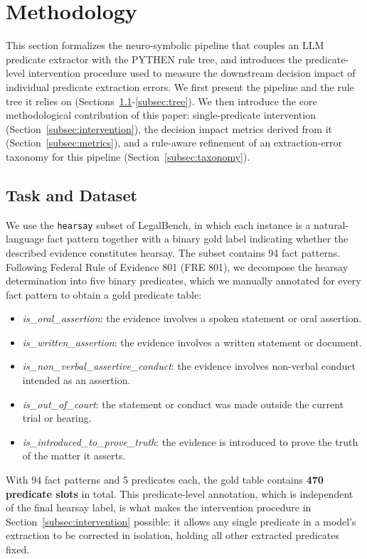 \section{Methodology}
\label{sec:method}

This section formalizes the neuro-symbolic pipeline that couples an LLM predicate extractor with the PYTHEN rule tree, and introduces the predicate-level intervention procedure used to measure the downstream decision impact of individual predicate extraction errors. We first present the pipeline and the rule tree it relies on (Sections~\ref{subsec:task}-\ref{subsec:tree}). We then introduce the core methodological contribution of this paper: single-predicate intervention (Section~\ref{subsec:intervention}), the decision impact metrics derived from it (Section~\ref{subsec:metrics}), and a rule-aware refinement of an extraction-error taxonomy for this pipeline (Section~\ref{subsec:taxonomy}).

\subsection{Task and Dataset}
\label{subsec:task}
We use the \texttt{hearsay} subset of LegalBench, in which each instance is a natural-language fact pattern together with a binary gold label indicating whether the described evidence constitutes hearsay. The subset contains 94 fact patterns. Following Federal Rule of Evidence 801 (FRE 801), we decompose the hearsay determination into five binary predicates, which we manually annotated for every fact pattern to obtain a gold predicate table:
\begin{itemize}
    \item \textit{is\_oral\_assertion}: the evidence involves a spoken statement or oral assertion.
    \item \textit{is\_written\_assertion}: the evidence involves a written statement or document.
    \item \textit{is\_non\_verbal\_assertive\_conduct}: the evidence involves non-verbal conduct intended as an assertion.
    \item \textit{is\_out\_of\_court}: the statement or conduct was made outside the current trial or hearing.
    \item \textit{is\_introduced\_to\_prove\_truth}: the evidence is introduced to prove the truth of the matter it asserts.
\end{itemize}
With 94 fact patterns and 5 predicates each, the gold table contains \textbf{470 predicate slots} in total. This predicate-level annotation, which is independent of the final hearsay label, is what makes the intervention procedure in Section~\ref{subsec:intervention} possible: it allows any single predicate in a model's extraction to be corrected in isolation, holding all other extracted predicates fixed.

